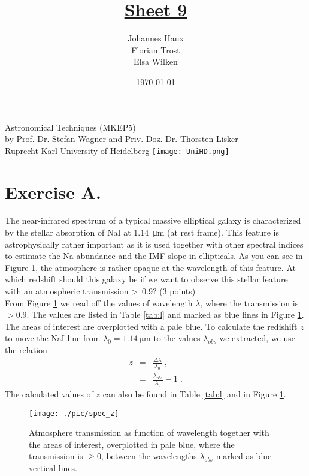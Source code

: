 \documentclass[11pt,a4paper,twoside]{article}
\title{\LARGE \underline {Sheet 9}}
\author{Johannes Haux \\ Florian Trost \\ Elsa Wilken}
\date{\today}
\begin{document}
\maketitle
\thispagestyle{empty}

\begin{center}
  Astronomical Techniques (MKEP5) \\
  \baselineskip35pt
  by Prof. Dr. Stefan Wagner and Priv.-Doz. Dr. Thorsten Lisker \\
  \baselineskip60pt
  Ruprecht Karl University of Heidelberg
\vskip 40pt
\texttt{[image: UniHD.png]}

\end{center}

\newpage
\setcounter{page}{1}		%

\section*{Exercise A.}

The near-infrared spectrum of a typical massive elliptical galaxy is
characterized by the stellar absorption of NaI at \SI{1.14}{\micro\meter} (at
rest frame). This feature is astrophysically rather important as it is used
together with other spectral indices to estimate the Na abundance and the IMF
slope in ellipticals.  As you can see in Figure \ref{fig:z}, the atmosphere is
rather opaque at the wavelength of this feature. At which redshift should this
galaxy be if we want to observe this stellar feature with an atmospheric
transmission \textgreater \ 0.9? (3 points)\\

From Figure \ref{fig:z} we read off the values of wavelength $\lambda$, where
the transmission is $> 0.9$. The values are listed in Table \ref{tab:l} and
marked as blue lines in Figure \ref{fig:z}. The areas of interest are
overplotted with a pale blue. To calculate the redishift $z$ to move the
NaI-line from $\lambda_0=\SI{1.14}{\micro\meter}$ to the values $\lambda_{obs}$
we extracted, we use the relation
\begin{eqnarray}
    z   &=& \frac{\Delta \lambda}{\lambda_0}\;, \\
        &=& \frac{\lambda_{obs}}{\lambda_0} -1\;.
\end{eqnarray}
The calculated values of $z$ can also be found in Table \ref{tab:l} and in 
Figure \ref{fig:z}.

\begin{figure}[h!]
\centering
\texttt{[image: ./pic/spec\_z]}
\caption{Atmosphere transmission as function of wavelength together with the
         areas of interest, overplotted in pale blue, where the transmission is
         $\geq 0$, between the wavelengths $\lambda_{obs}$ marked as blue
         vertical lines.}
\label{fig:z}
\end{figure}
\end{document}
